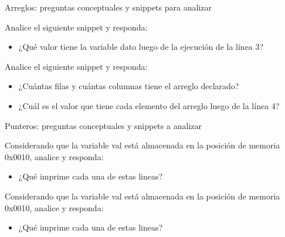 \documentclass[xcolor=pdftex,table,11pt]{beamer}
\begin{document}
\begin{frame}[allowframebreaks]{Arreglos: preguntas conceptuales y snippets para analizar}
\newpage

Analice el siguiente snippet y responda:

\codesetstylefrombeamer
{}


\begin{itemize}

\item ¿Qué valor tiene la variable dato luego de la ejecución de la línea 3?


\end{itemize}


\newpage

Analice el siguiente snippet y responda:

\codesetstylefrombeamer
{}


\begin{itemize}

\item ¿Cuántas filas y cuántas columnas tiene el arreglo declarado?

\item ¿Cuál es el valor que tiene cada elemento del arreglo luego de la línea 4?


\end{itemize}

\end{frame}

\begin{frame}[allowframebreaks]{Punteros: preguntas conceptuales y snippets a analizar}

Considerando que la variable val está almacenada en la posición de memoria 0x0010, analice y responda:

\codesetstylefrombeamer
{}


\begin{itemize}

\item ¿Qué imprime cada una de estas lineas?


\end{itemize}



\newpage
Considerando que la variable val está almacenada en la posición de memoria 0x0010, analice y responda:

\codesetstylefrombeamer
{}


\begin{itemize}

\item ¿Qué imprime cada una de estas lineas?


\end{itemize}

\end{frame}
\end{document}
